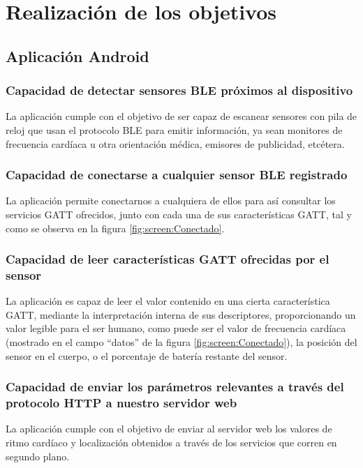 \section{Realización de los objetivos}

\subsection{Aplicación Android}

\subsubsection{Capacidad de detectar sensores BLE próximos al dispositivo}
    La aplicación cumple con el objetivo de ser capaz de escanear sensores con pila de reloj que usan el protocolo BLE para emitir información, ya sean monitores de frecuencia cardíaca u otra orientación médica, emisores de publicidad, etcétera.

\subsubsection{Capacidad de conectarse a cualquier sensor BLE registrado}
    La aplicación permite conectarnos a cualquiera de ellos para así consultar los servicios GATT ofrecidos, junto con cada una de sus características GATT, tal y como se observa en la figura \ref{fig:screen:Conectado}.

\subsubsection{Capacidad de leer características GATT ofrecidas por el sensor}
    La aplicación es capaz de leer el valor contenido en una cierta característica GATT, mediante la interpretación interna de sus descriptores, proporcionando un valor legible para el ser humano, como puede ser el valor de frecuencia cardíaca (mostrado en el campo ``datos'' de la figura \ref{fig:screen:Conectado}), la posición del sensor en el cuerpo, o el porcentaje de batería restante del sensor.
    
\subsubsection{Capacidad de enviar los parámetros relevantes a través del protocolo HTTP a nuestro servidor web}
   La aplicación cumple con el objetivo de enviar al servidor web los valores de ritmo cardíaco y localización obtenidos a través de los servicios que corren en segundo plano.
    
